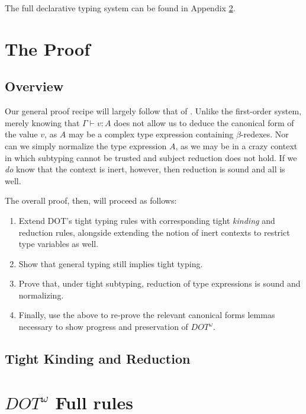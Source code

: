 \documentclass[a4paper, 10pt]{article}
\newcommand{\DOTw}{\ensuremath{DOT^\omega}}
\begin{document}
The full declarative typing system can be found in Appendix
\ref{appendix:dotw-rules}.

\section{The Proof}

\subsection{Overview}

Our general proof recipe will largely follow that of \citet{rapoport2017}.
Unlike the first-order system, merely knowing that $\Gamma \vdash v: A$ does
not allow us to deduce the canonical form of the value $v$, as $A$ may be a
complex type expression containing $\beta$-redexes. Nor can we simply normalize
the type expression $A$, as we may be in a crazy context in which subtyping
cannot be trusted and subject reduction does not hold. If we \emph{do} know
that the context is inert, however, then reduction is sound and all is well.

The overall proof, then, will proceed as follows:

\begin{enumerate}
  \item Extend DOT's tight typing rules with corresponding tight \emph{kinding}
    and reduction rules, alongside extending the notion of inert contexts to
    restrict type variables as well.
  \item Show that general typing still implies tight typing.
  \item Prove that, under tight subtyping, reduction of type expressions is
    sound and normalizing.
  \item Finally, use the above to re-prove the relevant canonical forms lemmas
    necessary to show progress and preservation of $\DOTw$.
\end{enumerate}

\subsection{Tight Kinding and Reduction}\label{sec:tight-typing}

\appendix

\section{\DOTw{} Full rules}\label{appendix:dotw-rules}
\end{document}
